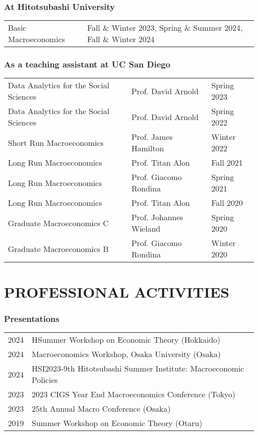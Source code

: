 \documentclass[12pt]{article}
\begin{document}
\subsubsection*{At Hitotsubashi University}
\begin{tabular}{@{}ll}
Basic Macroeconomics&Fall \& Winter 2023, Spring \& Summer 2024, Fall \& Winter 2024
\end{tabular}

\subsubsection*{As a teaching assistant at UC San Diego}
\begin{tabular}{@{}lll}
Data Analytics for the Social Sciences&Prof. David Arnold&Spring 2023\\
Data Analytics for the Social Sciences&Prof. David Arnold&Spring 2022\\
Short Run Macroeconomics&Prof. James Hamilton&Winter 2022\\
Long Run Macroeconomics&Prof. Titan Alon&Fall 2021\\
Long Run Macroeconomics&Prof. Giacomo Rondina&Spring 2021\\
Long Run Macroeconomics&Prof. Titan Alon&Fall 2020\\
Graduate Macroeconomics C&Prof. Johannes Wieland&Spring 2020\\
Graduate Macroeconomics B&Prof. Giacomo Rondina&Winter 2020
\end{tabular}

\section*{PROFESSIONAL ACTIVITIES}
\subsubsection*{Presentations}
\begin{tabular}{@{}ll}
2024&HSummer Workshop on Economic Theory (Hokkaido)\\
2024&Macroeconomics Workshop, Osaka University (Osaka)\\
2024&HSI2023-9th Hitotsubashi Summer Institute: Macroeconomic Policies\\
2023&2023 CIGS Year End Macroeconomics Conference (Tokyo)\\
2023&25th Annual Macro Conference (Osaka)\\
2019&Summer Workshop on Economic Theory (Otaru)
\end{tabular}
\end{document}
